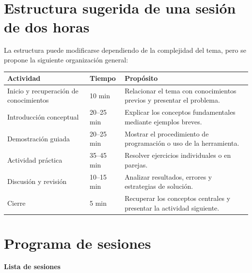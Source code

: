 \documentclass[12pt,letterpaper]{article}
\begin{document}
\section{Estructura sugerida de una sesión de dos horas}

La estructura puede modificarse dependiendo de la complejidad del tema,
pero se propone la siguiente organización general:

\begin{table}[H]
\centering
\begin{tabular}{p{4.5cm}p{2cm}p{9cm}}
\toprule
\textbf{Actividad} & \textbf{Tiempo} & \textbf{Propósito} \\
\midrule
Inicio y recuperación de conocimientos & 10 min &
Relacionar el tema con conocimientos previos y presentar el problema. \\

Introducción conceptual & 20--25 min &
Explicar los conceptos fundamentales mediante ejemplos breves. \\

Demostración guiada & 20--25 min &
Mostrar el procedimiento de programación o uso de la herramienta. \\

Actividad práctica & 35--45 min &
Resolver ejercicios individuales o en parejas. \\

Discusión y revisión & 10--15 min &
Analizar resultados, errores y estrategias de solución. \\

Cierre & 5 min &
Recuperar los conceptos centrales y presentar la actividad siguiente. \\
\bottomrule
\end{tabular}
\end{table}

\section{Programa de sesiones}
{\Large{\textbf{Lista de sesiones}}}
\end{document}
